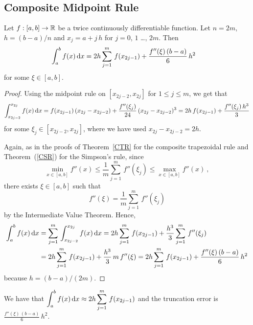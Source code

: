 \subsection{Composite Midpoint Rule}

\begin{theorem}
Let $f:[a,b]\rightarrow \mathbb{R}$ be a twice continuously
differentiable function.  Let $n=2m$, $h=(b-a)/n$ and
$x_j = a+j\,h$ for $j=0$, $1$ \ldots, $2m$.  Then
\begin{align*}
\int_{a}^{b} f(x)\,\mathrm{d}x &= 2h \sum_{j=1}^m\,f(x_{2j-1}) +
\frac{f''(\xi)\,(b-a)}{6}\,h^2
\end{align*}
for some $\xi \in [a,b]$.
\label{CMR}
\end{theorem}

\begin{proof}
Using the midpoint rule on $[x_{2j-2},x_{2j}]$ for $1\leq j \leq m$,
we get that
\[
\int_{x_{2j-2}}^{x_{2j}} f(x) \,\mathrm{d}x =
f(x_{2j-1})\left(x_{2j}-x_{2j-2}\right) +
\frac{f''(\xi_j)}{24}\,(x_{2j}-x_{2j-2})^3
= 2h\,f(x_{2j-1}) + \frac{f''(\xi_j)\,h^3}{3}
\]
for some $\xi_j \in [x_{2j-2},x_{2j}]$, where we have used
$x_{2j} -x_{2j-2} = 2h$.

Again, as in the proofs of Theorem~\ref{CTR} for the composite
trapezoidal rule and Theorem~(\ref{CSR}) for the Simpson's rule, since
\[
\min_{x\in [a,b]} f''(x) \leq
\frac{1}{m}\sum_{j=1}^m\,f''(\xi_j) \leq
\max_{x\in [a,b]} f''(x) \ ,
\]
there exists $\xi \in [a,b]$ such that
\[
f''(\xi) = \frac{1}{m}\sum_{j=1}^m\,f''(\xi_j)
\]
by the Intermediate Value Theorem.  Hence,
\begin{align*}
\int_a^b f(x) \,\mathrm{d}x &= \sum_{j=1}^m\,
 \int_{x_{2j-2}}^{x_{2j}} f(x)\,\mathrm{d}x
= 2h \sum_{j=1}^m\,f(x_{2j-1}) + \frac{h^3}{3}
 \sum_{j=1}^m\,f''(\xi_j) \\
&= 2h \sum_{j=1}^m\,f(x_{2j-1}) +
\frac{h^3}{3}\,m\,f''(\xi)
= 2h \sum_{j=1}^m\,f(x_{2j-1}) + \frac{f''(\xi)\,(b-a)}{6}\,h^2
\end{align*}
because $h = (b-a)/(2m)$.
\end{proof}


\begin{rmk}
We have that
$\displaystyle \int_a^b f(x)\,\mathrm{d}x \approx
2h \sum_{j=1}^m\,f(x_{2j-1})$ and the truncation error is
$\displaystyle \frac{f''(\xi)\,(b-a)}{6}\,h^2$.
\end{rmk}

